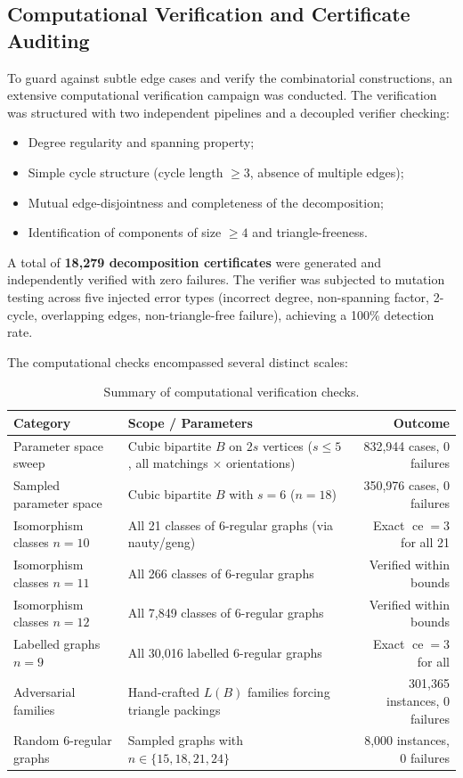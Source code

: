 \documentclass[11pt,reqno]{amsart}
\theoremstyle{definition}
\theoremstyle{remark}
\DeclareMathOperator{\ce}{ce}
\begin{document}
\subsection{Computational Verification and Certificate Auditing}
To guard against subtle edge cases and verify the combinatorial constructions, an extensive computational verification campaign was conducted. The verification was structured with two independent pipelines and a decoupled verifier checking:
\begin{itemize}
    \item Degree regularity and spanning property;
    \item Simple cycle structure (cycle length $\ge 3$, absence of multiple edges);
    \item Mutual edge-disjointness and completeness of the decomposition;
    \item Identification of components of size $\ge 4$ and triangle-freeness.
\end{itemize}

A total of \textbf{18,279 decomposition certificates} were generated and independently verified with zero failures. The verifier was subjected to mutation testing across five injected error types (incorrect degree, non-spanning factor, 2-cycle, overlapping edges, non-triangle-free failure), achieving a 100\% detection rate.

The computational checks encompassed several distinct scales:
\begin{table}[ht]
\centering
\small
\caption{Summary of computational verification checks.}
\label{tab:verification}
\begin{tabular}{l>{\raggedright\arraybackslash}p{6.0cm}r}
\toprule
\textbf{Category} & \textbf{Scope / Parameters} & \textbf{Outcome} \\
\midrule
Parameter space sweep & Cubic bipartite $B$ on $2s$ vertices ($s \le 5$, all matchings $\times$ orientations) & 832,944 cases, 0 failures \\
\addlinespace
Sampled parameter space & Cubic bipartite $B$ with $s = 6$ ($n = 18$) & 350,976 cases, 0 failures \\
\addlinespace
Isomorphism classes $n = 10$ & All 21 classes of $6$-regular graphs (via nauty/geng) & Exact $\ce = 3$ for all 21 \\
\addlinespace
Isomorphism classes $n = 11$ & All 266 classes of $6$-regular graphs & Verified within bounds \\
\addlinespace
Isomorphism classes $n = 12$ & All 7,849 classes of $6$-regular graphs & Verified within bounds \\
\addlinespace
Labelled graphs $n = 9$ & All 30,016 labelled $6$-regular graphs & Exact $\ce = 3$ for all \\
\addlinespace
Adversarial families & Hand-crafted $L(B)$ families forcing triangle packings & 301,365 instances, 0 failures \\
\addlinespace
Random $6$-regular graphs & Sampled graphs with $n \in \{15, 18, 21, 24\}$ & 8,000 instances, 0 failures \\
\bottomrule
\end{tabular}
\end{table}
\end{document}
